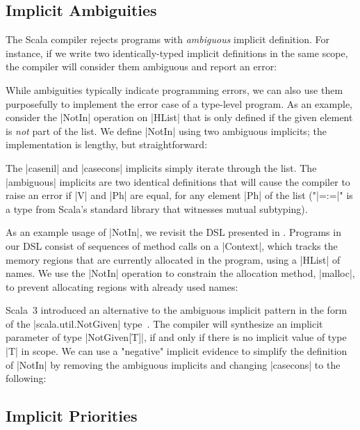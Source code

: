 \subsection{Implicit Ambiguities}

The Scala compiler rejects programs with \emph{ambiguous} implicit definition.
For instance, if we write two identically-typed implicit definitions in the same scope, the compiler will consider them ambiguous and report an error:

\implicitAmbiguity

While ambiguities typically indicate programming errors, we can also use them purposefully to implement the error case of a type-level program.
As an example, consider the |NotIn| operation on |HList| that is only defined if the given element is \emph{not} part of the list.
We define |NotIn| using two ambiguous implicits; the implementation is lengthy, but straightforward:

\memImplicitNotIn

\noindent
The |casenil| and |casecons| implicits simply iterate through the list.
The |ambiguous| implicits are two identical definitions that will cause the compiler to raise an error if |V| and |Ph| are equal, for any element |Ph| of the list ("|=:=|" is a type from Scala's standard library that witnesses mutual subtyping).

As an example usage of |NotIn|, we revisit the DSL presented in .
Programs in our DSL consist of sequences of method calls on a |Context|, which tracks the memory regions that are currently allocated in the program, using a |HList| of names.
We use the |NotIn| operation to constrain the allocation method, |malloc|, to prevent allocating regions with already used names:

\memImplicitContextMalloc

Scala~3 introduced an alternative to the ambiguous implicit pattern in the form of the |scala.util.NotGiven| type~\citep[Given Instances]{odersky2013scala}.
The compiler will synthesize an implicit parameter of type |NotGiven[T]|, if and only if there is no implicit value of type |T| in scope.
We can use a "negative" implicit evidence to simplify the definition of |NotIn| by removing the ambiguous implicits and changing |casecons| to the following:

\memImplicitNotGiven

\subsection{Implicit Priorities}

